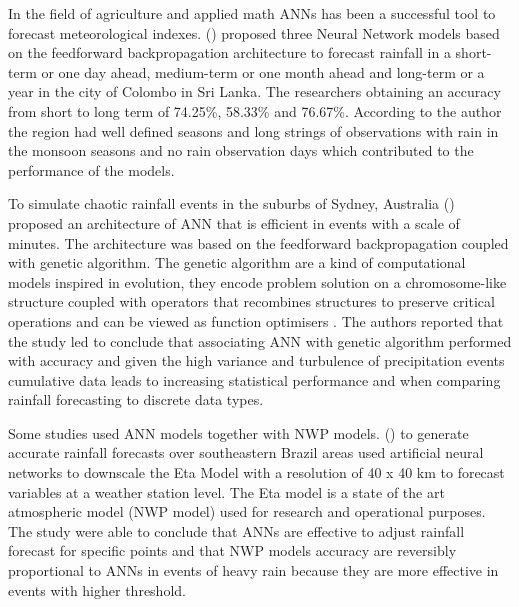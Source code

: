 In the field of agriculture and applied math ANNs has been a successful tool to forecast meteorological indexes. \citeauthor{kumarasiri2006rainfall}  (\citeyear{kumarasiri2006rainfall}) proposed three Neural Network models  based on the feedforward backpropagation architecture to forecast rainfall in a short-term or one day ahead, medium-term or one month ahead and long-term or a year in the city of Colombo in Sri Lanka. The researchers obtaining an accuracy from short to long term of 74.25\%, 58.33\% and 76.67\%. According to the author the region had well defined seasons and long strings of observations with rain in the monsoon seasons and no rain observation days which contributed to the performance of the models. 

To simulate chaotic rainfall events in the suburbs of Sydney, Australia \citeauthor{nasseri2008optimized} (\citeyear{nasseri2008optimized}) proposed an architecture of ANN that is efficient in events with a scale of minutes. The architecture was based on the feedforward backpropagation coupled with genetic algorithm. The genetic algorithm are a kind of computational models inspired in evolution, they encode problem solution on a chromosome-like structure coupled with operators that recombines structures to preserve critical operations and can be viewed as function optimisers \cite{whitley1994genetic}. The authors reported that the study led to conclude that associating ANN with genetic algorithm performed with accuracy and given the high variance and turbulence of precipitation events cumulative data leads to increasing statistical performance and when comparing rainfall forecasting to discrete data types.

Some studies used  ANN models together with NWP models. \citeauthor{ramirez2006linear} (\citeyear{ramirez2006linear}) to generate accurate rainfall forecasts over southeastern Brazil areas used artificial neural networks to downscale the Eta Model with a resolution of 40 x 40 km to forecast variables at a weather station level. The Eta model is a state of the art atmospheric model (NWP model) used for research and operational purposes. The study were able to conclude that ANNs are effective to adjust rainfall forecast for specific points and that NWP models accuracy are reversibly proportional to ANNs in events of heavy rain because they are more effective in events with higher threshold.

